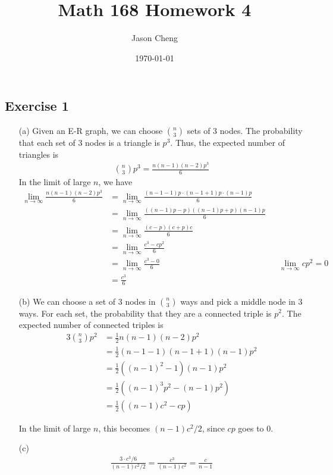 \documentclass{article}
\title{Math 168 Homework 4}
\author{Jason Cheng}
\date{\today}
\begin{document}
\maketitle

\subsection*{Exercise 1}

\begin{enumerate}
  \item[(a)]
  Given an E-R graph, we can choose \( \binom{n}{3} \) sets of 3 nodes. The
  probability that each set of 3 nodes is a triangle is \( p^3 \). Thus, the
  expected number of triangles is
  \begin{align*}
    \binom{n}{3} p^3 = \frac{n(n - 1)(n - 2)p^3}{6}
  \end{align*}
  In the limit of large \( n \), we have
  \begin{align*}
    \lim_{n \to \infty} \frac{n(n - 1)(n - 2)p^3}{6}
    &= \lim_{n \to \infty} \frac{(n - 1 - 1)p \cdot (n - 1 + 1)p \cdot (n - 1)p}{6} \\
    &= \lim_{n \to \infty} \frac{((n - 1)p - p)((n - 1)p + p)(n - 1)p}{6} \\
    &= \lim_{n \to \infty} \frac{(c - p)(c + p)c}{6} \\
    &= \lim_{n \to \infty} \frac{c^3 - cp^2}{6} \\
    &= \lim_{n \to \infty} \frac{c^3 - 0}{6} && \lim_{n \to \infty} cp^2 = 0 \\
    &= \frac{c^3}{6}
  \end{align*}

  \item[(b)]
  We can choose a set of 3 nodes in \( \binom{n}{3} \) ways and pick a middle
  node in 3 ways. For each set, the probability that they are a connected triple
  is \( p^2 \). The expected number of connected triples is
  \begin{align*}
    3 \binom{n}{3} p^2 &= \frac{1}{2} n(n - 1)(n - 2)p^2 \\
    &= \frac{1}{2} (n - 1 - 1)(n - 1 + 1)(n - 1)p^2 \\
    &= \frac{1}{2} ((n - 1)^2 - 1)(n - 1)p^2 \\
    &= \frac{1}{2} ((n - 1)^3 p^2 - (n - 1) p^2) \\
    &= \frac{1}{2} ((n - 1)c^2 - cp)
  \end{align*}

  In the limit of large \( n \), this becomes \( (n - 1)c^2 / 2 \), since \( cp
  \) goes to 0.

  \item[(c)]
  \begin{align*}
    \frac{3 \cdot c^3 / 6}{(n - 1)c^2 / 2} = \frac{c^3}{(n - 1)c^2} = \boxed{\frac{c}{n
    - 1}}
  \end{align*}
\end{enumerate}
\end{document}
